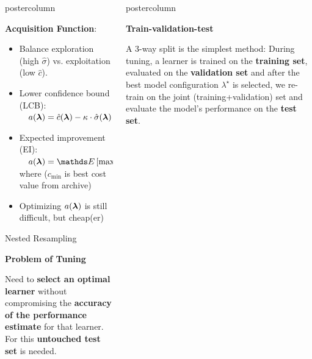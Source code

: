 \documentclass{beamer}
\newlength{\columnheight} %
\begin{document}
\begin{frame}[fragile]{}
\begin{columns}
\begin{column}{.31\textwidth}
\begin{beamercolorbox}[center]{postercolumn}
\begin{minipage}{.98\textwidth}
{\begin{myblock}{ }
  \textbf{Acquisition Function}: 
  \begin{itemize}[$\bullet$]
    \setlength{\itemindent}{+.3in}
      \item Balance exploration (high $\hat \sigma$) vs. exploitation (low $\hat c$). 
      \item Lower confidence bound (LCB): $\quad a(\bm{\bm{\lambda}}) = \hat c(\bm{\lambda}) - \kappa \cdot \hat \sigma(\bm{\lambda})$ 
      \item Expected improvement (EI): $\quad a(\lamv) = \E\left[\max\left\{c_{\min} - C(\lamv), 0\right\}\right]$ where ($c_{\min}$ is best cost value from archive)
      \item Optimizing $a(\bm{\lambda})$ is still difficult, but cheap(er)
  \end{itemize}

  \end{myblock}
  
  \begin{myblock}{Nested Resampling}
  \begin{codebox} \textbf{Problem of Tuning}	\end{codebox}
  Need to \textbf{select an optimal learner} without compromising the \textbf{accuracy of the performance estimate} for that learner. For this \textbf{untouched test set} is needed.
  
  \end{myblock}
  }
\end{minipage}
\end{beamercolorbox}
\end{column}
  
  \begin{column}{.31\textwidth}
\begin{beamercolorbox}[center]{postercolumn}
\begin{minipage}{.98\textwidth}
\parbox[t][\columnheight]{\textwidth}{
  \begin{myblock}{}
  
    \begin{codebox} \textbf{Train-validation-test}	\end{codebox}
  A 3-way split is the simplest method:
    During tuning, a learner is trained on the \textbf{training set}, evaluated on the  \textbf{validation set} and after the best model configuration $\lambda^\star$ is selected, we re-train on the joint (training+validation) set and evaluate the model's performance on the \textbf{test set}.\\


\end{myblock}}
\end{minipage}
\end{beamercolorbox}
\end{column}
\end{columns}
\end{frame}
\end{document}
